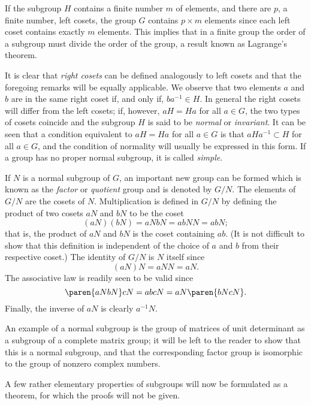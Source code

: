 If the subgroup $H$ contains a finite number $m$ of elements, and there are $p$, a finite number, left cosets, the group $G$ contains $p \times m$ elements since each left coset contains exactly $m$ elements. This implies that in a finite group the order of a subgroup must divide the order of the group, a result known as Lagrange's theorem.

It is clear that \emph{right cosets} can be defined analogously to left cosets and that the foregoing remarks will be equally applicable. We observe that two elements $a$ and $b$ are in the same right coset if, and only if, $ba^{-1} \in H$. In general the right cosets will differ from the left cosets; if, however, $aH = Ha$ for all $a \in G$, the two types of cosets coincide and the subgroup $H$ is said to be \emph{normal} or \emph{invariant}. It can be seen that a condition equivalent to $aH = Ha$ for all $a \in G$ is that $aHa^{-1} \subset H$ for all $a \in G$, and the condition of normality will usually be expressed in this form. If a group has no proper normal subgroup, it is called \emph{simple}.

If $N$ is a normal subgroup of $G$, an important new group can be formed which is known as the \emph{factor} or \emph{quotient} group and is denoted by $G/N$. The elements of $G/N$ are the cosets of $N$. Multiplication is defined in $G/N$ by defining the product of two cosets $aN$ and $bN$ to be the coset 
\begin{equation*}
  (aN)(bN) = aNbN = abNN = abN ;
\end{equation*}
that is, the product of $aN$ and $bN$ is the coset containing $ab$. (It is not difficult to show that this definition is independent of the choice of $a$ and $b$ from their respective coset.) The identity of $G/N$ is $N$ itself since 
\begin{equation*}
  (aN)N = aNN = aN .
\end{equation*}
The associative law is readily seen to be valid since 
\begin{equation*}
  \paren{aNbN} cN= abcN = aN \paren{bNcN} .
\end{equation*}
Finally, the inverse of $aN$ is clearly $a^{-1}N$.

An example of a normal subgroup is the group of matrices of unit determinant as a subgroup of a complete matrix group; it will be left to the reader to show that this is a normal subgroup, and that the corresponding factor group is isomorphic to the group of nonzero complex numbers.

A few rather elementary properties of subgroups will now be formulated as a theorem, for which the proofs will not be given.


